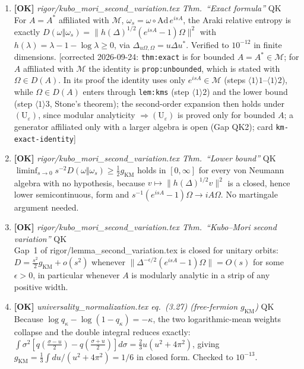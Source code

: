 \documentclass[11pt]{article}
\begin{document}
\begin{enumerate}[leftmargin=1.6em,itemsep=6pt]
\item \textbf{[OK]} \emph{rigor/kubo\_mori\_second\_variation.tex Thm.~``Exact formula''} \hfill\textsc{QK}\\ For \(A=A^*\) affiliated with \(\mathcal M\), \(\omega_s=\omega\circ\mathrm{Ad}\,e^{isA}\), the Araki relative entropy is exactly \(D(\omega\Vert\omega_s)=\lVert h(\Delta)^{1/2}(e^{isA}-1)\Omega\rVert^2\) with \(h(\lambda)=\lambda-1-\log\lambda\ge0\), via \(\Delta_{u\Omega,\Omega}=u\Delta u^*\). Verified to \(10^{-12}\) in finite dimensions. [corrected 2026-09-24: \texttt{thm:exact} is for bounded \(A=A^*\in\mathcal M\); for \(A\) affiliated with \(\mathcal M\) the identity is \texttt{prop:unbounded}, which is stated with \(\Omega\in D(A)\). In its proof the identity uses only \(e^{isA}\in\mathcal M\) (steps \(\langle1\rangle1\)--\(\langle1\rangle2\)), while \(\Omega\in D(A)\) enters through \texttt{lem:kms} (step \(\langle1\rangle2\)) and the lower bound (step \(\langle1\rangle3\), Stone's theorem); the second-order expansion then holds under \((\mathrm U_\varepsilon)\), since modular analyticity \(\Rightarrow(\mathrm U_\varepsilon)\) is proved only for bounded \(A\); a generator affiliated only with a larger algebra is open (Gap QK2); card \texttt{km-exact-identity}]
\item \textbf{[OK]} \emph{rigor/kubo\_mori\_second\_variation.tex Thm.~``Lower bound''} \hfill\textsc{QK}\\ \(\liminf_{s\to0}s^{-2}D(\omega\Vert\omega_s)\ge\frac12 g_{\mathrm{KM}}\) holds in \([0,\infty]\) for every von Neumann algebra with no hypothesis, because \(v\mapsto\lVert h(\Delta)^{1/2}v\rVert^2\) is a closed, hence lower semicontinuous, form and \(s^{-1}(e^{isA}-1)\Omega\to iA\Omega\). No martingale argument needed.
\item \textbf{[OK]} \emph{rigor/kubo\_mori\_second\_variation.tex Thm.~``Kubo--Mori second variation''} \hfill\textsc{QK}\\ Gap~1 of rigor/lemma\_second\_variation.tex is closed for unitary orbits: \(D=\frac{s^2}2 g_{\mathrm{KM}}+o(s^2)\) whenever \(\lVert\Delta^{-\epsilon/2}(e^{isA}-1)\Omega\rVert=O(s)\) for some \(\epsilon>0\), in particular whenever \(A\) is modularly analytic in a strip of any positive width.
\item \textbf{[OK]} \emph{universality\_normalization.tex eq.~(3.27) (free-fermion \(g_{\mathrm{KM}}\))} \hfill\textsc{QK}\\ Because \(\log q_\kappa-\log(1-q_\kappa)=-\kappa\), the two logarithmic-mean weights collapse and the double integral reduces exactly: \(\int\sigma^2[q(\frac{\sigma-u}2)-q(\frac{\sigma+u}2)]d\sigma=\frac23 u(u^2+4\pi^2)\), giving \(g_{\mathrm{KM}}=\frac13\int du/(u^2+4\pi^2)=1/6\) in closed form. Checked to \(10^{-13}\).

\end{enumerate}
\end{document}
